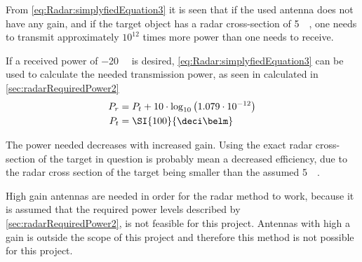 From \autoref{eq:Radar:simplyfiedEquation3} it is seen that if the used antenna does not have any gain, and if the target object has a radar cross-section of \SI{5}{\deci\belsm}, one needs to transmit approximately $10^{12}$ times more power than one needs to receive. 

If a received power of \SI{-20}{\deci\belm} is desired, \autoref{eq:Radar:simplyfiedEquation3} can be used to calculate the needed transmission power, as seen in calculated in \autoref{sec:radarRequiredPower2}
\begin{subequations}
\begin{align}  
P_{r} &= P_{t} + 10\cdot \log_{10}\left(1.079 \cdot 10^{-12}\right) \notag \\ 
P_{t} &= \SI{100}{\deci\belm} \label{sec:radarRequiredPower2}
\end{align}
\end{subequations}

The power needed decreases with increased gain. Using the exact radar cross-section of the target in question is probably mean a decreased efficiency, due to the radar cross section of the target being smaller than the assumed \SI{5}{\deci\belsm}. 

High gain antennas are needed in order for the radar method to work, because it is assumed that the required power levels described by \autoref{sec:radarRequiredPower2}, is not feasible for this project. Antennas with high a gain is outside the scope of this project and therefore this method is not possible for this project.

%

